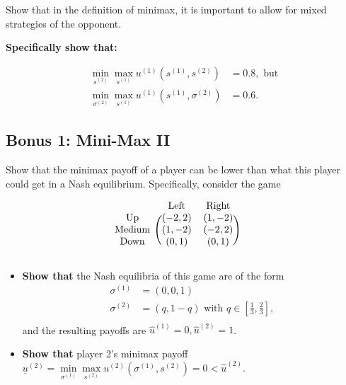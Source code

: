 \documentclass[10pt]{article}
\begin{document}
Show that in the definition of minimax, it is important to allow for mixed
strategies of the opponent.

\textbf{Specifically show that:}

\begin{align*}
    \min\limits_{s^{(2)}} \max\limits_{s^{(1)}} u^{(1)}(s^{(1)}, s^{(2)}) & = 0.8, \text{ but} \\
    \min\limits_{\sigma^{(2)}} \max\limits_{s^{(1)}} u^{(1)}(s^{(1)}, \sigma^{(2)}) & = 0.6.
\end{align*}


\subsection*{Bonus 1: Mini-Max II}

Show that the minimax payoff of a player can be lower than what this player
could get in a Nash equilibrium. Specifically, consider the game

\begin{equation*}
    \begin{blockarray}{cccc}
        & \text{Left} & \text{Right} \\
        \begin{block}{c(ccc)}
            \text{Up}  & (-2, 2)   & (1, -2)  \\
            \text{Medium} & (1, -2)   & (-2, 2)  \\
            \text{Down} & (0, 1) & (0, 1) \\
        \end{block}
    \end{blockarray}\qquad
\end{equation*}

\begin{itemize}
    \item \textbf{Show that} the Nash equilibria of this game are of the form
    \begin{align*}
        \sigma^{(1)} & = (0, 0, 1) \\
        \sigma^{(2)} & = (q, 1- q) \text{ with } q \in \left[\frac{1}{3}, \frac{2}{3}\right],\\
    \end{align*}
    and the resulting payoffs are \(\hat{u}^{(1)} = 0, \hat{u}^{(2)} = 1\).
    \item \textbf{Show that} player 2's minimax payoff \(\underline{u}^{(2)} =
    \min\limits_{\sigma^{(1)}} \max\limits_{s^{(2)}} u^{(2)}(\sigma^{(1)},
    s^{(2)}) = 0 < \hat{u}^{(2)}\).
\end{itemize}
\end{document}
